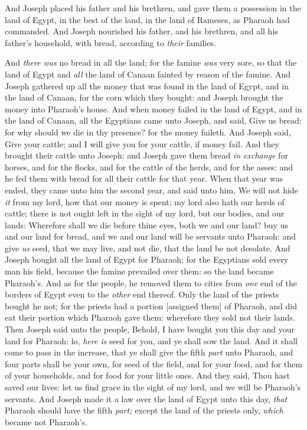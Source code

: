 \documentclass[11pt,letterpaper,oneside]{memoir}
\begin{document}
And Joseph placed his father and his brethren, and gave them a
possession in the land of Egypt, in the best of the land, in the land of
Rameses, as Pharaoh had commanded. And Joseph nourished his father, and
his brethren, and all his father's household, with bread, according to
\emph{their} families.

And \emph{there was} no bread in all the land; for the famine \emph{was}
very sore, so that the land of Egypt and \emph{all} the land of Canaan
fainted by reason of the famine. And Joseph gathered up all the money
that was found in the land of Egypt, and in the land of Canaan, for the
corn which they bought: and Joseph brought the money into Pharaoh's
house. And when money failed in the land of Egypt, and in the land of
Canaan, all the Egyptians came unto Joseph, and said, Give us bread: for
why should we die in thy presence? for the money faileth. And Joseph
said, Give your cattle; and I will give you for your cattle, if money
fail. And they brought their cattle unto Joseph: and Joseph gave them
bread \emph{in exchange} for horses, and for the flocks, and for the
cattle of the herds, and for the asses: and he fed them with bread for
all their cattle for that year. When that year was ended, they came unto
him the second year, and said unto him, We will not hide \emph{it} from
my lord, how that our money is spent; my lord also hath our herds of
cattle; there is not ought left in the sight of my lord, but our bodies,
and our lands: Wherefore shall we die before thine eyes, both we and our
land? buy us and our land for bread, and we and our land will be
servants unto Pharaoh: and give \emph{us} seed, that we may live, and
not die, that the land be not desolate. And Joseph bought all the land
of Egypt for Pharaoh; for the Egyptians sold every man his field,
because the famine prevailed over them: so the land became Pharaoh's.
And as for the people, he removed them to cities from \emph{one} end of
the borders of Egypt even to the \emph{other} end thereof. Only the land
of the priests bought he not; for the priests had a portion [assigned
them] of Pharaoh, and did eat their portion which Pharaoh gave them:
wherefore they sold not their lands. Then Joseph said unto the people,
Behold, I have bought you this day and your land for Pharaoh: lo,
\emph{here is} seed for you, and ye shall sow the land. And it shall
come to pass in the increase, that ye shall give the fifth \emph{part}
unto Pharaoh, and four parts shall be your own, for seed of the field,
and for your food, and for them of your households, and for food for
your little ones. And they said, Thou hast saved our lives: let us find
grace in the sight of my lord, and we will be Pharaoh's servants. And
Joseph made it a law over the land of Egypt unto this day, \emph{that}
Pharaoh should have the fifth \emph{part;} except the land of the
priests only, \emph{which} became not Pharaoh's.
\end{document}
